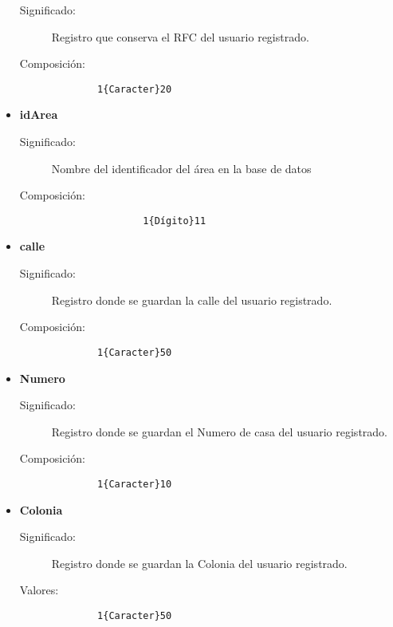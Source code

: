 \begin{itemize}
    \begin{description}
      \item [Significado:] Registro que conserva el RFC del usuario registrado.
      \item [Composición:]{\begin{lstlisting}
        1{Caracter}20\end{lstlisting}}
    \end{description}
  \item \textbf{idArea}\label{dd:idArea}
    \begin{description}
      			\item [Significado:] Nombre del identificador del área en la base de datos
			\item [Composición:]{\begin{lstlisting}
				1{Dígito}11\end{lstlisting}}
    \end{description}
      \item \textbf{calle}\label{dd:calle}
    \begin{description}
      \item [Significado:] Registro donde se guardan la calle del usuario registrado.
      \item [Composición:]{\begin{lstlisting}
        1{Caracter}50\end{lstlisting}}
    \end{description}
  \item \textbf{Numero}\label{dd:no}
    \begin{description}
      \item [Significado:] Registro donde se guardan el Numero de casa del usuario registrado.
      \item [Composición:]{\begin{lstlisting}
        1{Caracter}10\end{lstlisting}}
    \end{description}
  \item \textbf{Colonia}\label{dd:colonia}
    \begin{description}
      \item [Significado:] Registro donde se guardan la Colonia del usuario registrado.
      \item [Valores:]{\begin{lstlisting}
        1{Caracter}50\end{lstlisting}}
    \end{description}

\end{itemize}
